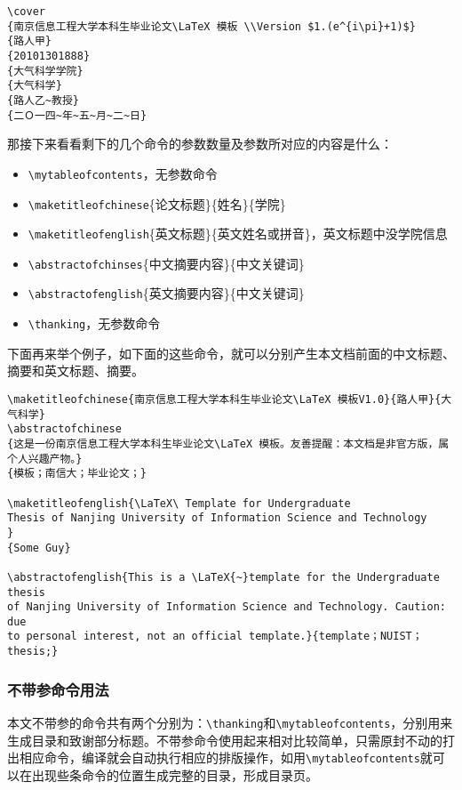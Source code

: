 {\color{green!50!black}
\begin{verbatim}
\cover
{南京信息工程大学本科生毕业论文\LaTeX 模板 \\Version $1.(e^{i\pi}+1)$}
{路人甲}
{20101301888}
{大气科学学院}
{大气科学}
{路人乙~教授}
{二Ｏ一四~年~五~月~二~日}
\end{verbatim}
}
那接下来看看剩下的几个命令的参数数量及参数所对应的内容是什么：
{\color{blue}
\begin{itemize}
\item \verb|\mytableofcontents|，无参数命令
\item \verb|\maketitleofchinese|\{论文标题\}\{姓名\}\{学院\}
\item \verb|\maketitleofenglish|\{英文标题\}\{英文姓名或拼音\}，英文标题中没学院信息
\item \verb|\abstractofchinses|\{中文摘要内容\}\{中文关键词\}
\item \verb|\abstractofenglish|\{英文摘要内容\}\{中文关键词\}
\item \verb|\thanking|，无参数命令
\end{itemize}
}
下面再来举个例子，如下面的这些命令，就可以分别产生本文档前面的中文标题、摘要和英文标题、摘要。
{\color{green!50!black}
\begin{verbatim}
\maketitleofchinese{南京信息工程大学本科生毕业论文\LaTeX 模板V1.0}{路人甲}{大气科学}
\abstractofchinese
{这是一份南京信息工程大学本科生毕业论文\LaTeX 模板。友善提醒：本文档是非官方版，属个人兴趣产物。}
{模板；南信大；毕业论文；}

\maketitleofenglish{\LaTeX\ Template for Undergraduate 
Thesis of Nanjing University of Information Science and Technology
}
{Some Guy}

\abstractofenglish{This is a \LaTeX{~}template for the Undergraduate thesis 
of Nanjing University of Information Science and Technology. Caution: due 
to personal interest, not an official template.}{template；NUIST；thesis;}
\end{verbatim}
}
\subsubsection{不带参命令用法}
本文不带参的命令共有两个分别为：\verb|\thanking|和\verb|\mytableofcontents|，分别用来生成目录和致谢部分标题。不带参命令使用起来相对比较简单，只需原封不动的打出相应命令，编译就会自动执行相应的排版操作，如用\verb|\mytableofcontents|就可以在出现些条命令的位置生成完整的目录，形成目录页。